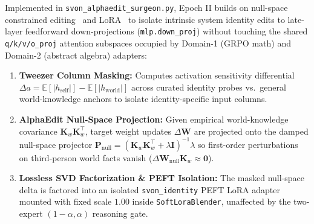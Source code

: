 \documentclass[11pt,a4paper]{article}
\begin{document}
Implemented in \texttt{svon\_alphaedit\_surgeon.py}, Epoch II builds on null-space constrained editing~\cite{fang2024alphaedit} and LoRA~\cite{hu2021lora} to isolate intrinsic system identity edits to late-layer feedforward down-projections (\texttt{mlp.down\_proj}) without touching the shared \texttt{q/k/v/o\_proj} attention subspaces occupied by Domain-1 (GRPO math) and Domain-2 (abstract algebra) adapters:
\begin{enumerate}[leftmargin=1.5em]
    \item \textbf{Tweezer Column Masking:} Computes activation sensitivity differential $\Delta a = \mathbb{E}[|h_{\text{self}}|] - \mathbb{E}[|h_{\text{world}}|]$ across curated identity probes vs.\ general world-knowledge anchors to isolate identity-specific input columns.
    \item \textbf{AlphaEdit Null-Space Projection:} Given empirical world-knowledge covariance $\mathbf{K}_w \mathbf{K}_w^\top$, target weight updates $\Delta \mathbf{W}$ are projected onto the damped null-space projector $\mathbf{P}_{\text{null}} = (\mathbf{K}_w \mathbf{K}_w^\top + \lambda \mathbf{I})^{-1} \lambda$ so first-order perturbations on third-person world facts vanish ($\Delta \mathbf{W}_{\text{null}} \mathbf{K}_w \approx \mathbf{0}$).
    \item \textbf{Lossless SVD Factorization \& PEFT Isolation:} The masked null-space delta is factored into an isolated \texttt{svon\_identity} PEFT LoRA adapter mounted with fixed scale $1.00$ inside \texttt{SoftLoraBlender}, unaffected by the two-expert $(1-\alpha, \alpha)$ reasoning gate.
\end{enumerate}
\end{document}
